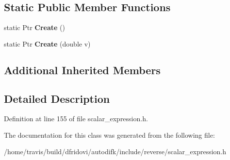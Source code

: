 \subsection*{Static Public Member Functions}
\begin{DoxyCompactItemize}
\item 
\hypertarget{classautodifk_1_1reverse_1_1_constant_scalar_expression_a0408fecd73c15d83ef9bd23dd0af7c09}{static Ptr {\bfseries Create} ()}\label{classautodifk_1_1reverse_1_1_constant_scalar_expression_a0408fecd73c15d83ef9bd23dd0af7c09}

\item 
\hypertarget{classautodifk_1_1reverse_1_1_constant_scalar_expression_a58c272a8761a2939d387616ef090a45a}{static Ptr {\bfseries Create} (double v)}\label{classautodifk_1_1reverse_1_1_constant_scalar_expression_a58c272a8761a2939d387616ef090a45a}

\end{DoxyCompactItemize}
\subsection*{Additional Inherited Members}


\subsection{Detailed Description}


Definition at line 155 of file scalar\-\_\-expression.\-h.



The documentation for this class was generated from the following file\-:\begin{DoxyCompactItemize}
\item 
/home/travis/build/dfridovi/autodifk/include/reverse/scalar\-\_\-expression.\-h\end{DoxyCompactItemize}
